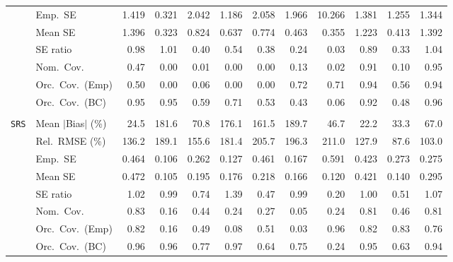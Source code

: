 \begin{landscape}
\begin{longtable}{llrrrrrrrrrr}
 & Emp.\ SE & 1.419 & 0.321 & 2.042 & 1.186 & 2.058 & 1.966 & 10.266 & 1.381 & 1.255 & 1.344 \\
 & Mean SE & 1.396 & 0.323 & 0.824 & 0.637 & 0.774 & 0.463 & 0.355 & 1.223 & 0.413 & 1.392 \\
 & SE ratio & \cellcolor{ranktwo}0.98 & \cellcolor{rankone}1.01 & 0.40 & 0.54 & 0.38 & 0.24 & 0.03 & 0.89 & 0.33 & \cellcolor{rankthree}1.04 \\
 & Nom.\ Cov. & \cellcolor{rankthree}0.47 & 0.00 & 0.01 & 0.00 & 0.00 & 0.13 & 0.02 & \cellcolor{ranktwo}0.91 & 0.10 & \cellcolor{rankone}0.95 \\
 & Orc.\ Cov.\ (Emp) & 0.50 & 0.00 & 0.06 & 0.00 & 0.00 & \cellcolor{rankthree}0.72 & 0.71 & \cellcolor{rankone}0.94 & 0.56 & \cellcolor{ranktwo}0.94 \\
 & Orc.\ Cov.\ (BC) & \cellcolor{rankone}0.95 & \cellcolor{ranktwo}0.95 & 0.59 & 0.71 & 0.53 & 0.43 & 0.06 & 0.92 & 0.48 & \cellcolor{rankthree}0.96 \\
\addlinespace[2pt]
\multicolumn{12}{l}{\textbf{Continuous Phase-One Covariates}} \\
\addlinespace[2pt]
\quad \texttt{SRS} & Mean $|$Bias$|$ (\%) & \cellcolor{ranktwo}24.5 & 181.6 & 70.8 & 176.1 & 161.5 & 189.7 & 46.7 & \cellcolor{rankone}22.2 & \cellcolor{rankthree}33.3 & 67.0 \\
 & Rel.\ RMSE (\%) & 136.2 & 189.1 & 155.6 & 181.4 & 205.7 & 196.3 & 211.0 & \cellcolor{rankthree}127.9 & \cellcolor{rankone}87.6 & \cellcolor{ranktwo}103.0 \\
 & Emp.\ SE & 0.464 & 0.106 & 0.262 & 0.127 & 0.461 & 0.167 & 0.591 & 0.423 & 0.273 & 0.275 \\
 & Mean SE & 0.472 & 0.105 & 0.195 & 0.176 & 0.218 & 0.166 & 0.120 & 0.421 & 0.140 & 0.295 \\
 & SE ratio & 1.02 & \cellcolor{rankthree}0.99 & 0.74 & 1.39 & 0.47 & \cellcolor{ranktwo}0.99 & 0.20 & \cellcolor{rankone}1.00 & 0.51 & 1.07 \\
 & Nom.\ Cov. & \cellcolor{rankone}0.83 & 0.16 & 0.44 & 0.24 & 0.27 & 0.05 & 0.24 & \cellcolor{ranktwo}0.81 & 0.46 & \cellcolor{rankthree}0.81 \\
 & Orc.\ Cov.\ (Emp) & \cellcolor{rankthree}0.82 & 0.16 & 0.49 & 0.08 & 0.51 & 0.03 & \cellcolor{rankone}0.96 & 0.82 & \cellcolor{ranktwo}0.83 & 0.76 \\
 & Orc.\ Cov.\ (BC) & 0.96 & \cellcolor{ranktwo}0.96 & 0.77 & 0.97 & 0.64 & 0.75 & 0.24 & \cellcolor{rankone}0.95 & 0.63 & \cellcolor{rankthree}0.94 \\

\end{longtable}
\end{landscape}
